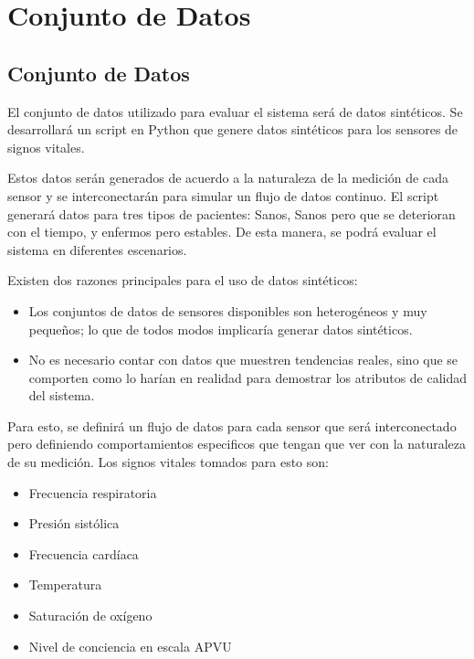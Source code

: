 \section{Conjunto de Datos}

\subsection{Conjunto de Datos}

El conjunto de datos utilizado para evaluar el sistema será de datos sintéticos. 
Se desarrollará un script en Python que genere datos sintéticos para los sensores de signos vitales.\newline

Estos datos serán generados de acuerdo a la naturaleza de la medición de cada sensor y se interconectarán para simular un flujo de datos continuo.
El script generará datos para tres tipos de pacientes: Sanos, Sanos pero que se deterioran con el tiempo, y enfermos pero estables. 
De esta manera, se podrá evaluar el sistema en diferentes escenarios.\newline

Existen dos razones principales para el uso de datos sintéticos: 

\begin{itemize}
    \item Los conjuntos de datos de sensores disponibles son heterogéneos y muy pequeños; lo que de todos modos implicaría generar datos sintéticos.
    \item No es necesario contar con datos que muestren tendencias reales, sino que se comporten como lo harían en realidad para demostrar los atributos de calidad del sistema.
\end{itemize}

Para esto, se definirá un flujo de datos para cada sensor que será interconectado pero definiendo comportamientos especificos que tengan que ver con la naturaleza de su medición.
Los signos vitales tomados para esto son: 

\begin{itemize}
    \item Frecuencia respiratoria
    \item Presión sistólica
    \item Frecuencia cardíaca
    \item Temperatura
    \item Saturación de oxígeno
    \item Nivel de conciencia en escala APVU
\end{itemize}